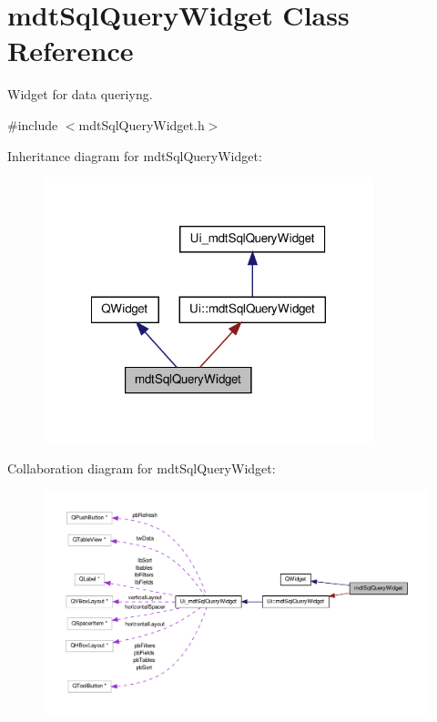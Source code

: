 \hypertarget{classmdt_sql_query_widget}{\section{mdt\-Sql\-Query\-Widget Class Reference}
\label{classmdt_sql_query_widget}
}


Widget for data queriyng.  




{\ttfamily \#include $<$mdt\-Sql\-Query\-Widget.\-h$>$}



Inheritance diagram for mdt\-Sql\-Query\-Widget\-:\nopagebreak
\begin{figure}[H]
\begin{center}
\leavevmode
\includegraphics[width=272pt]{classmdt_sql_query_widget__inherit__graph}
\end{center}
\end{figure}


Collaboration diagram for mdt\-Sql\-Query\-Widget\-:\nopagebreak
\begin{figure}[H]
\begin{center}
\leavevmode
\includegraphics[width=350pt]{classmdt_sql_query_widget__coll__graph}
\end{center}
\end{figure}
